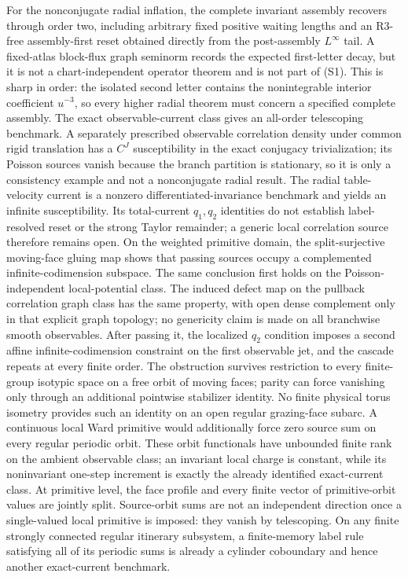 \documentclass[11pt]{amsart}
\theoremstyle{compactplain}
\theoremstyle{compactdefinition}
\theoremstyle{compactremark}
\begin{document}
For the nonconjugate radial inflation, the complete invariant assembly
recovers through order two, including arbitrary fixed positive waiting
lengths and an R3-free assembly-first reset obtained directly from the
post-assembly \(L^\infty\) tail.  A fixed-atlas block-flux graph seminorm
records the expected first-letter decay, but it is not a chart-independent
operator theorem and is not part of (S1).
This is sharp in
order: the isolated second letter contains the nonintegrable interior
coefficient \(u^{-3}\), so every higher radial theorem must concern a
specified complete assembly.  The exact observable-current class gives an
all-order telescoping benchmark.  A separately prescribed observable
correlation density under common rigid translation has a \(C^J\)
susceptibility in the exact conjugacy trivialization; its Poisson sources
vanish because the branch partition is stationary, so it is only a consistency
example and not a nonconjugate radial result.  The radial table-velocity current is a
nonzero differentiated-invariance benchmark and yields an infinite
susceptibility.  Its total-current \(q_1,q_2\) identities do not establish
label-resolved reset or the strong Taylor remainder; a generic local
correlation source therefore remains open.  On the weighted primitive domain,
the split-surjective moving-face
gluing map shows that passing sources occupy a complemented
infinite-codimension subspace.  The same conclusion first holds on the
Poisson-independent local-potential class.  The induced defect map on the
pullback correlation graph class has the same property, with open dense
complement only in that explicit graph topology; no genericity claim is made
on all branchwise smooth observables.  After
passing it, the localized \(q_2\)
condition imposes a second affine infinite-codimension constraint on the first
observable jet, and the cascade repeats at every finite order.
The obstruction survives restriction to every finite-group isotypic
space on a free orbit of moving faces; parity can force vanishing only through
an additional pointwise stabilizer identity.  No finite physical torus
isometry provides such an identity on an open regular grazing-face subarc.
A continuous local Ward primitive would additionally force zero source sum on
every regular periodic orbit.  These orbit functionals have unbounded finite
rank on the ambient observable class; an invariant local charge is constant,
while its noninvariant one-step increment is exactly the already identified
exact-current class.  At primitive level, the face profile and every finite
vector of primitive-orbit values are jointly split.  Source-orbit sums are not
an independent direction once a single-valued local primitive is imposed:
they vanish by telescoping.  On any finite strongly connected
regular itinerary subsystem, a finite-memory label rule satisfying all of its
periodic sums is already a cylinder coboundary and hence another exact-current
benchmark.
\end{document}
